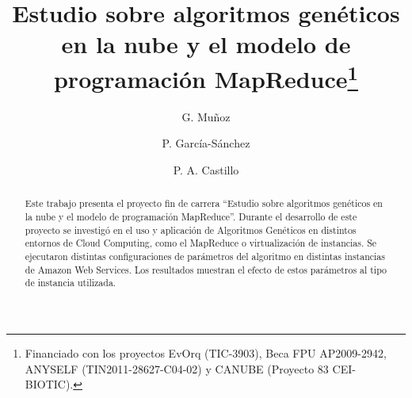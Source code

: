 \documentclass[runningheads]{llncs}
\begin{document}
 \pagestyle{empty} %
\mainmatter  %

\title{Estudio sobre algoritmos genéticos en la nube y el modelo de programación MapReduce\thanks{Financiado con los proyectos EvOrq (TIC-3903), Beca FPU AP2009-2942, ANYSELF (TIN2011-28627-C04-02) y CANUBE (Proyecto 83 CEI-BIOTIC). }}



%
%
\author{G. Mu\~noz  \and P. Garc\'ia-S\'anchez  \and P. A. Castillo  }%
%



%
%

\maketitle


\begin{abstract}
Este trabajo presenta el proyecto fin de carrera ``Estudio sobre algoritmos genéticos en la nube y el modelo de programación MapReduce''. Durante el desarrollo de este proyecto se investigó en el uso y aplicación de Algoritmos Genéticos en distintos entornos de Cloud Computing, como el MapReduce o virtualización de instancias. Se ejecutaron distintas configuraciones de parámetros del algoritmo en distintas instancias de Amazon Web Services. Los resultados muestran el efecto de estos parámetros al tipo de instancia utilizada.

\end{abstract}
\end{document}
